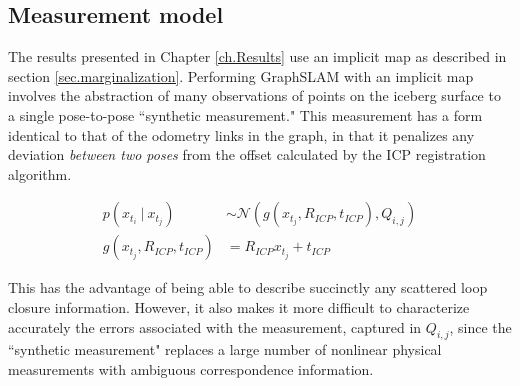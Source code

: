 \subsection{Measurement model}

The results presented in Chapter \ref{ch.Results} use an implicit map as described in section \ref{sec.marginalization}. Performing GraphSLAM with an implicit map involves the abstraction of many observations of points on the iceberg surface to a single pose-to-pose ``synthetic measurement." This measurement has a form identical to that of the odometry links in the graph, in that it penalizes any deviation \emph{between two poses} from the offset calculated by the ICP registration algorithm.  



%
%


\begin{align}
p\left(x_{t_i}~|~x_{t_j}\right) & \sim \mathcal{N}\left(g(x_{t_j},R_{ICP},t_{ICP}), Q_{i,j}\right) \\
g(x_{t_j},R_{ICP},t_{ICP}) &= R_{ICP}x_{t_j} + t_{ICP}
\end{align}

This has the advantage of being able to describe succinctly any scattered loop closure information. However, it also makes it more difficult to characterize accurately the errors associated with the measurement, captured in $Q_{i,j}$, since the ``synthetic measurement" replaces a large number of nonlinear physical measurements with ambiguous correspondence information.

